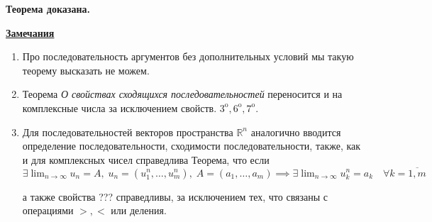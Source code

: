\documentclass{article}
\newcommand{\parspace}{\vspace{10pt}}
\newcommand{\dslim}{\displaystyle\lim}
\newcommand{\dslimn}{\dslim_{n \to \infty}}
\newcommand{\prop}[1]{#1^{\text{o}}}
\begin{document}
\textbf{Теорема доказана.}

\parspace

\underline{\textbf{Замечания}}

\begin{enumerate}
    \item Про последовательность аргументов без дополнительных условий мы такую
    теорему высказать не можем.

    \item Теорема \textit{О свойствах сходящихся последовательностей} переносится
    и на комплексные числа за исключением свойств. $\prop{3}, \prop{6}, \prop{7}$.

    \item Для последовательностей векторов пространства $\mathbb{R}^n$ аналогично
    вводится определение последовательности, сходимости последовательности,
    также, как и для комплексных чисел справедлива Теорема, что если
    $\exists \dslimn u_n = A, \; u_n = (u_1^n, \dots, u_m^n), \;
    A = (a_1, \dots, a_m) \implies \exists \dslimn u_k^n = a_k \quad 
    \forall k = \overline{1, m}$

    а также свойства ??? справедливы, за исключением тех, что связаны
    с операциями $>, <$ или деления.
\end{enumerate}
\end{document}
